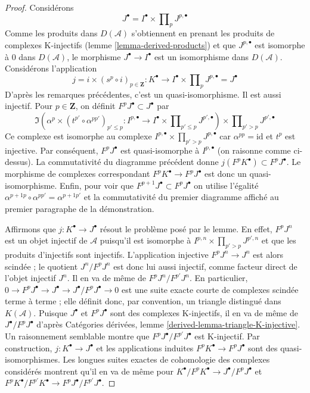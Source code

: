 \begin{proof}
\medskip\noindent
Considérons
$$
J^\bullet = I^\bullet \times \prod\nolimits_p J^{p, \bullet}
$$
Comme les produits dans $D(\mathcal{A})$ s'obtiennent en prenant
les produits de complexes K-injectifs
(lemme \ref{lemma-derived-products}) et que $J^{p, \bullet}$
est isomorphe à $0$ dans $D(\mathcal{A})$, le morphisme
$J^\bullet \to I^\bullet$ est un isomorphisme dans $D(\mathcal{A})$.
Considérons l'application
$$
j = i \times (s^p \circ i)_{p \in \mathbf{Z}} :
K^\bullet
\longrightarrow
I^\bullet \times \prod\nolimits_p J^{p, \bullet} = J^\bullet
$$
D'après les remarques précédentes, c'est un quasi-isomorphisme. Il est aussi
injectif. Pour $p \in \mathbf{Z}$, on définit $F^pJ^\bullet \subset J^\bullet$ par
$$
\Im\left(
\alpha^p \times (t^{p'} \circ \alpha^{pp'})_{p' \leq p} :
I^{p, \bullet}
\to
I^\bullet \times \prod\nolimits_{p' \leq p} J^{p', \bullet}
\right)
\times \prod\nolimits_{p' > p} J^{p', \bullet}
$$
Ce complexe est isomorphe au complexe
$I^{p, \bullet} \times \prod_{p' > p} J^{p, \bullet}$
car $\alpha^{pp} = \text{id}$ et $t^p$ est injective.
Par conséquent, $F^pJ^\bullet$ est quasi-isomorphe à $I^{p, \bullet}$
(on raisonne comme ci-dessus). La commutativité du diagramme précédent donne
$j(F^pK^\bullet) \subset F^pJ^\bullet$. Le morphisme de complexes correspondant
$F^pK^\bullet \to F^pJ^\bullet$ est donc un quasi-isomorphisme.
Enfin, pour voir que
$F^{p + 1}J^\bullet \subset F^pJ^\bullet$
on utilise l'égalité $\alpha^{p + 1p} \circ \alpha^{pp'} = \alpha^{p + 1p'}$
et la commutativité du premier diagramme affiché au premier paragraphe
de la démonstration.

\medskip\noindent
Affirmons que $j : K^\bullet \to J^\bullet$ résout le problème posé par le
lemme. En effet, $F^pJ^n$ est un objet injectif de $\mathcal{A}$ puisqu'il est
isomorphe à $I^{p, n} \times \prod_{p' > p} J^{p', n}$ et que les produits
d'injectifs sont injectifs. L'application injective $F^pJ^n \to J^n$ est alors
scindée ; le quotient $J^n/F^pJ^n$ est donc lui aussi injectif, comme facteur
direct de l'objet injectif $J^n$. Il en va de même de
$F^pJ^n/F^{p'}J^n$. En particulier,
$0 \to F^pJ^\bullet \to J^\bullet \to J^\bullet/F^pJ^\bullet \to 0$
est une suite exacte courte de complexes scindée terme à terme ; elle définit
donc, par convention, un triangle distingué dans $K(\mathcal{A})$.
Puisque $J^\bullet$ et $F^pJ^\bullet$ sont des complexes K-injectifs, il en va
de même de $J^\bullet/F^pJ^\bullet$ d'après Catégories dérivées, lemme
\ref{derived-lemma-triangle-K-injective}. Un raisonnement semblable montre que
$F^pJ^\bullet/F^{p'}J^\bullet$ est K-injectif. Par construction,
$j : K^\bullet \to J^\bullet$ et les applications induites
$F^pK^\bullet \to F^pJ^\bullet$ sont des quasi-isomorphismes. Les longues
suites exactes de cohomologie des complexes considérés montrent qu'il en va
de même pour
$K^\bullet/F^pK^\bullet \to J^\bullet/F^pJ^\bullet$ et
$F^pK^\bullet/F^{p'}K^\bullet \to F^pJ^\bullet/F^{p'}J^\bullet$.
\end{proof}

